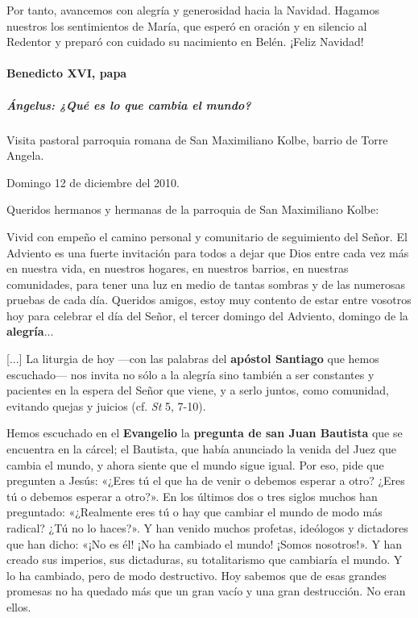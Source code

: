 \documentclass[]{article}
\let\oldparagraph\paragraph
\renewcommand{\paragraph}[1]{\oldparagraph{#1}\mbox{}}
\let\oldsubparagraph\subparagraph
\renewcommand{\subparagraph}[1]{\oldsubparagraph{#1}\mbox{}}
\begin{document}
Por tanto, avancemos con alegría y generosidad hacia la Navidad. Hagamos
nuestros los sentimientos de María, que esperó en oración y en silencio
al Redentor y preparó con cuidado su nacimiento en Belén. ¡Feliz
Navidad!

\paragraph{Benedicto XVI, papa}\label{benedicto-xvi-papa-2}

\subparagraph{Ángelus: ¿Qué es lo que cambia el
mundo?}\label{uxe1ngelus-quuxe9-es-lo-que-cambia-el-mundo}

Visita pastoral parroquia romana de San Maximiliano Kolbe, barrio de
Torre Angela. 

Domingo 12 de diciembre del 2010.

Queridos hermanos y hermanas de la parroquia de San Maximiliano Kolbe:

Vivid con empeño el camino personal y comunitario de seguimiento del
Señor. El Adviento es una fuerte invitación para todos a dejar que Dios
entre cada vez más en nuestra vida, en nuestros hogares, en nuestros
barrios, en nuestras comunidades, para tener una luz en medio de tantas
sombras y de las numerosas pruebas de cada día. Queridos amigos, estoy
muy contento de estar entre vosotros hoy para celebrar el día del Señor,
el tercer domingo del Adviento, domingo de la \textbf{alegría}...

{[}...{]} La liturgia de hoy ---con las palabras del \textbf{apóstol
Santiago} que hemos escuchado--- nos invita no sólo a la alegría sino
también a ser constantes y pacientes en la espera del Señor que viene, y
a serlo juntos, como comunidad, evitando quejas y juicios (cf. \emph{St}
5, 7-10).

Hemos escuchado en el \textbf{Evangelio} la \textbf{pregunta de san Juan
Bautista} que se encuentra en la cárcel; el Bautista, que había
anunciado la venida del Juez que cambia el mundo, y ahora siente que el
mundo sigue igual. Por eso, pide que pregunten a Jesús: «¿Eres tú el que
ha de venir o debemos esperar a otro? ¿Eres tú o debemos esperar a
otro?». En los últimos dos o tres siglos muchos han preguntado:
«¿Realmente eres tú o hay que cambiar el mundo de modo más radical? ¿Tú
no lo haces?». Y han venido muchos profetas, ideólogos y dictadores que
han dicho: «¡No es él! ¡No ha cambiado el mundo! ¡Somos nosotros!». Y
han creado sus imperios, sus dictaduras, su totalitarismo que cambiaría
el mundo. Y lo ha cambiado, pero de modo destructivo. Hoy sabemos que de
esas grandes promesas no ha quedado más que un gran vacío y una gran
destrucción. No eran ellos.
\end{document}
